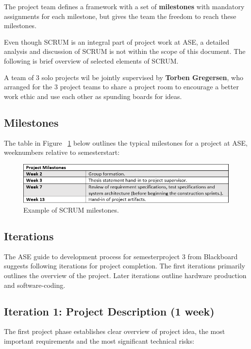 The project team defines a framework with a set of \textbf{milestones} with mandatory assignments for each milestone, but gives the team the freedom to reach these milestones. \newline

Even though SCRUM is an integral part of project work at ASE, a detailed analysis and discussion of SCRUM is not within the scope of this document. The following is brief overview of selected elements of SCRUM. \newline

A team of 3 solo projects wil be jointly supervised by \textbf{Torben Gregersen}, who arranged for the 3 project teams to share a project room to encourage a better work ethic and  use each other as spunding boards for ideas.

\subsection{Milestones}
The table in Figure ~\ref{fig:milestonespng} below outlines the typical milestones for a project at ASE, weeknumbers relative to semesterstart:

\begin{figure}[H]
\centering
\includegraphics[scale=0.8]{./pictures/milestones.png}
\caption{Example of SCRUM milestones.}
\label{fig:milestonespng}
\end{figure}

\subsection{Iterations}
The ASE guide to development process for semesterproject 3 from Blackboard suggests following iterations for project completion. The first iterations primarily outlines the overview of the project. Later iterations outline hardware production and software-coding. \\

\subsection{Iteration 1: Project Description (1 week)}
The first project phase establishes clear overview of project idea, the most important requirements and the most significant technical risks: \newline 

